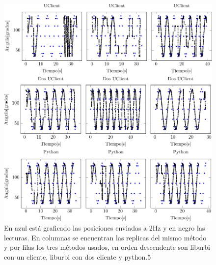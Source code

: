 \documentclass[12pt,a4paper,final,twoside]{book}
\begin{document}
\begin{figure}[H]
	\centering
    \includegraphics[scale=1]{plots/h2.pdf}
	 \caption{En azul está graficado las posiciones enviadas a 2Hz y en negro las lecturas. En columnas se encuentran las replicas del mismo método y por filas los tres métodos usados, en orden descendente son liburbi con un cliente, liburbi con dos cliente y python.5}
  \label{fig:sin2H}
\end{figure}
\end{document}
